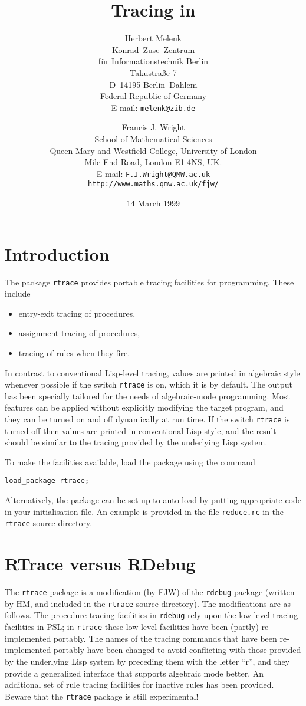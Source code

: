\documentclass[11pt,a4paper]{article}
\title{Tracing in \REDUCE{}}
\author{
Herbert Melenk \\[0.05in]
Konrad--Zuse--Zentrum \\
f\"ur Informationstechnik Berlin \\
Takustra\ss{}e 7 \\
D--14195 Berlin--Dahlem \\
Federal Republic of Germany \\[0.05in]
E-mail: \texttt{melenk@zib.de} \\
\and
Francis J. Wright \\[0.05in]
School of Mathematical Sciences \\
Queen Mary and Westfield College, University of London \\
Mile End Road, London E1 4NS, UK. \\[0.05in]
E-mail: \texttt{F.J.Wright@QMW.ac.uk} \\
\texttt{http://www.maths.qmw.ac.uk/\til fjw/}}
\date{14 March 1999}
\newcommand{\rdebug}{\texttt{rdebug}}
\newcommand{\rtrace}{\texttt{rtrace}}
\begin{document}
\maketitle

\section{Introduction}

The package \rtrace{} provides portable tracing facilities for
\REDUCE{} programming.  These include
\begin{itemize}
\item entry-exit tracing of procedures,
\item assignment tracing of procedures,
\item tracing of rules when they fire.
\end{itemize}
In contrast to conventional Lisp-level tracing, values are printed in
algebraic style whenever possible if the switch \rtrace{} is on, which
it is by default.  The output has been specially tailored for the
needs of algebraic-mode programming.  Most features can be applied
without explicitly modifying the target program, and they can be
turned on and off dynamically at run time.  If the switch \rtrace{} is
turned off then values are printed in conventional Lisp style, and the
result should be similar to the tracing provided by the underlying
Lisp system.

To make the facilities available, load the package using the command
\begin{verbatim}
load_package rtrace;
\end{verbatim}
Alternatively, the package can be set up to auto load by putting
appropriate code in your \REDUCE{} initialisation file.  An example is
provided in the file \texttt{reduce.rc} in the \rtrace{} source
directory.

\section{RTrace versus RDebug}

The \rtrace{} package is a modification (by FJW) of the \rdebug{}
package (written by HM, and included in the \rtrace{} source
directory).  The modifications are as follows.  The procedure-tracing
facilities in \rdebug{} rely upon the low-level tracing facilities in
PSL; in \rtrace{} these low-level facilities have been (partly)
re-implemented portably.  The names of the tracing commands that have
been re-implemented portably have been changed to avoid conflicting
with those provided by the underlying Lisp system by preceding them
with the letter ``r'', and they provide a generalized interface that
supports algebraic mode better.  An additional set of rule tracing
facilities for inactive rules has been provided.  Beware that the
\rtrace{} package is still experimental!
\end{document}
